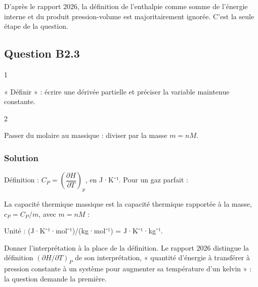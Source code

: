 \documentclass[11pt,a4paper]{article}
\newcommand{\equationajustee}[1]{%
  \sbox{\boiteequation}{$\displaystyle #1$}%
  \ifdim\wd\boiteequation>\linewidth
    \[\resizebox{\linewidth}{!}{\usebox{\boiteequation}}\]%
  \else
    \[#1\]%
  \fi}
\begin{document}
\begin{jury}

D'après le rapport 2026, la définition de l'enthalpie comme somme de l'énergie interne et du produit pression-volume est majoritairement ignorée. C'est la seule étape de la question.

\end{jury}

\hypertarget{question-b2.3}{%
\subsection{Question B2.3}\label{question-b2.3}}

\begin{indication}{1}

« Définir » : écrire une dérivée partielle et préciser la variable maintenue constante.

\end{indication}

\begin{indication}{2}

Passer du molaire au massique : diviser par la masse \(m = nM\).

\end{indication}

\hypertarget{solution-31}{%
\subsubsection{Solution}\label{solution-31}}

Définition : \(C_P = \left(\dfrac{\partial H}{\partial T}\right)_p\), en J·K⁻¹. Pour un gaz parfait :

\equationajustee{C_P = \frac{\gamma}{\gamma - 1}\,nR}

La capacité thermique massique est la capacité thermique rapportée à la masse, \(c_P = C_P/m\), avec \(m = nM\) :

\equationajustee{\boxed{c_P = \frac{1}{M}\,\frac{\gamma}{\gamma - 1}\,R}}

Unité : (J·K⁻¹·mol⁻¹)/(kg·mol⁻¹) = J·K⁻¹·kg⁻¹.

\begin{piege}

Donner l'interprétation à la place de la définition. Le rapport 2026 distingue la définition \((\partial H/\partial T)_P\) de son interprétation, « quantité d'énergie à transférer à pression constante à un système pour augmenter sa température d'un kelvin » : la question demande la première.

\end{piege}
\end{document}
